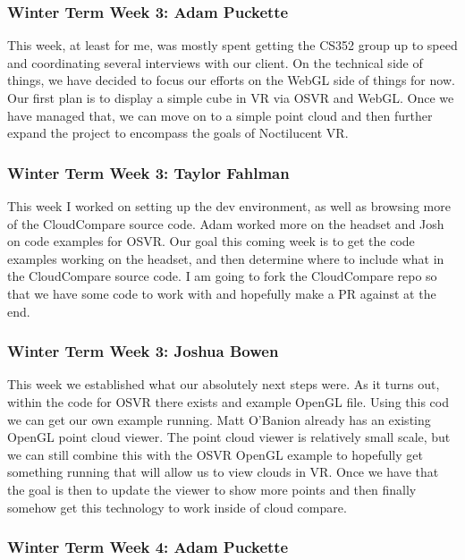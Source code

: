 \documentclass[draftclsnofoot,onecolumn]{IEEEtran}
\begin{document}
\subsubsection{Winter Term Week 3: Adam Puckette}

This week, at least for me, was mostly spent getting the CS352 group up to speed and coordinating several interviews with our client. On the technical side of things, we have decided to focus our efforts on the WebGL side of things for now. Our first plan is to display a simple cube in VR via OSVR and WebGL. Once we have managed that, we can move on to a simple point cloud and then further expand the project to encompass the goals of Noctilucent VR.

\subsubsection{Winter Term Week 3: Taylor Fahlman}

This week I worked on setting up the dev environment, as well as browsing more of the CloudCompare source code. Adam worked more on the headset and Josh on code examples for OSVR. Our goal this coming week is to get the code examples working on the headset, and then determine where to include what in the CloudCompare source code. I am going to fork the CloudCompare repo so that we have some code to work with and hopefully make a PR against at the end.

\subsubsection{Winter Term Week 3: Joshua Bowen}

This week we established what our absolutely next steps were. As it turns out, within the code for OSVR there exists and example OpenGL file. Using this cod we can get our own example running. Matt O'Banion already has an existing OpenGL point cloud viewer. The point cloud viewer is relatively small scale, but we can still combine this with the OSVR OpenGL example to hopefully get something running that will allow us to view clouds in VR. Once we have that the goal is then to update the viewer to show more points and then finally somehow get this technology to work inside of cloud compare.

\subsubsection{Winter Term Week 4: Adam Puckette}
\end{document}
